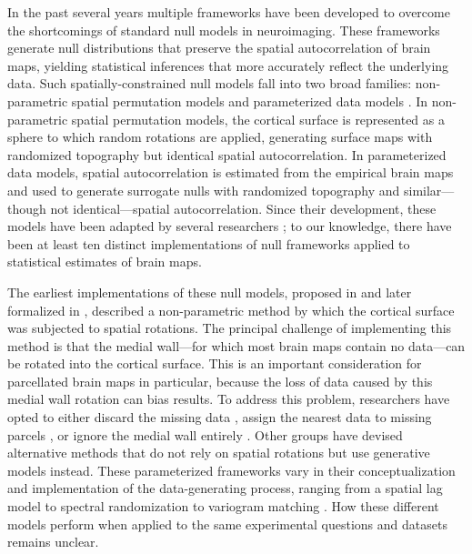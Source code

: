 \documentclass[12pt,aps,pra,reprint,showkeys]{revtex4-1}
\begin{document}
In the past several years multiple frameworks have been developed to overcome the shortcomings of standard null models in neuroimaging.
These frameworks generate null distributions that preserve the spatial autocorrelation of brain maps, yielding statistical inferences that more accurately reflect the underlying data.
Such spatially-constrained null models fall into two broad families: non-parametric spatial permutation models \citep{alexander2013convergence, alexanderbloch2018neuroimage} and parameterized data models \citep{burt2018natneuro, burt2020neuroimage, vosdewael2020brainspace}.
In non-parametric spatial permutation models, the cortical surface is represented as a sphere to which random rotations are applied, generating surface maps with randomized topography but identical spatial autocorrelation.
In parameterized data models, spatial autocorrelation is estimated from the empirical brain maps and used to generate surrogate nulls with randomized topography and similar---though not identical---spatial autocorrelation.
Since their development, these models have been adapted by several researchers \citep{baum2020pnas, cornblath2019arxiv, vasa2018cercor, vazquezrodriguez2019pnas}; to our knowledge, there have been at least ten distinct implementations of null frameworks applied to statistical estimates of brain maps.

The earliest implementations of these null models, proposed in \citet{alexander2013convergence} and later formalized in \citet{alexanderbloch2018neuroimage}, described a non-parametric method by which the cortical surface was subjected to spatial rotations.
The principal challenge of implementing this method is that the medial wall---for which most brain maps contain no data---can be rotated into the cortical surface.
This is an important consideration for parcellated brain maps in particular, because the loss of data caused by this medial wall rotation can bias results.
To address this problem, researchers have opted to either discard the missing data \citep{baum2020pnas, cornblath2019arxiv}, assign the nearest data to missing parcels \citep{vazquezrodriguez2019pnas}, or ignore the medial wall entirely \citep{vasa2018cercor}.
Other groups have devised alternative methods that do not rely on spatial rotations but use generative models instead.
These parameterized frameworks vary in their conceptualization and implementation of the data-generating process, ranging from a spatial lag model \citep{burt2018natneuro} to spectral randomization \citep{wagner2015generating, vosdewael2020brainspace} to variogram matching \citep{burt2020neuroimage}.
How these different models perform when applied to the same experimental questions and datasets remains unclear.
\end{document}
